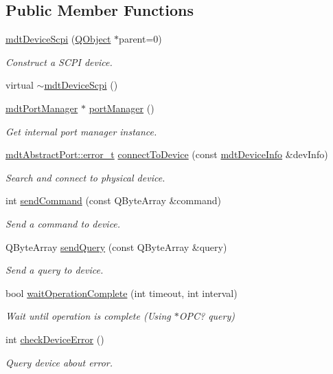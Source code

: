 \subsection*{Public Member Functions}
\begin{DoxyCompactItemize}
\item 
\hyperlink{classmdt_device_scpi_a44c03151a6796e5c1efd64ef55f2d14d}{mdt\-Device\-Scpi} (\hyperlink{class_q_object}{Q\-Object} $\ast$parent=0)
\begin{DoxyCompactList}\small\item\em Construct a S\-C\-P\-I device. \end{DoxyCompactList}\item 
virtual \hyperlink{classmdt_device_scpi_ae173b9ad3d528005e124624ca9bb7b64}{$\sim$mdt\-Device\-Scpi} ()
\item 
\hyperlink{classmdt_port_manager}{mdt\-Port\-Manager} $\ast$ \hyperlink{classmdt_device_scpi_a7dc5ab8856a766a45bcc7e9cba0f54ca}{port\-Manager} ()
\begin{DoxyCompactList}\small\item\em Get internal port manager instance. \end{DoxyCompactList}\item 
\hyperlink{classmdt_abstract_port_ad4121bb930c95887e77f8bafa065a85e}{mdt\-Abstract\-Port\-::error\-\_\-t} \hyperlink{classmdt_device_scpi_ae8e886b362cbf9d1bf7064b48348b8e8}{connect\-To\-Device} (const \hyperlink{classmdt_device_info}{mdt\-Device\-Info} \&dev\-Info)
\begin{DoxyCompactList}\small\item\em Search and connect to physical device. \end{DoxyCompactList}\item 
int \hyperlink{classmdt_device_scpi_ad98f24870f597c31d8788ab4f5bc53fc}{send\-Command} (const Q\-Byte\-Array \&command)
\begin{DoxyCompactList}\small\item\em Send a command to device. \end{DoxyCompactList}\item 
Q\-Byte\-Array \hyperlink{classmdt_device_scpi_a96df8073c8838cc819bf38ed330b076b}{send\-Query} (const Q\-Byte\-Array \&query)
\begin{DoxyCompactList}\small\item\em Send a query to device. \end{DoxyCompactList}\item 
bool \hyperlink{classmdt_device_scpi_aefd45e58d01aed9a165bb2c2dd98198c}{wait\-Operation\-Complete} (int timeout, int interval)
\begin{DoxyCompactList}\small\item\em Wait until operation is complete (Using $\ast$\-O\-P\-C? query) \end{DoxyCompactList}\item 
int \hyperlink{classmdt_device_scpi_a65c6f747ac6c6fe727a7359f78139168}{check\-Device\-Error} ()
\begin{DoxyCompactList}\small\item\em Query device about error. \end{DoxyCompactList}\end{DoxyCompactItemize}
